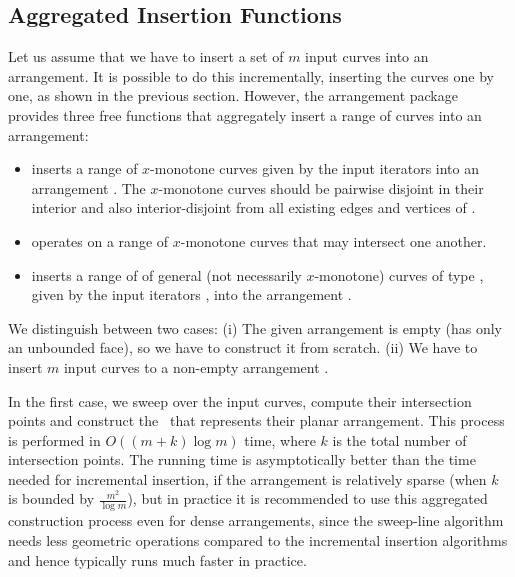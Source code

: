 
\subsection{Aggregated Insertion Functions}
\label{arr_ssec:agg_insert}

Let us assume that we have to insert a set of $m$ input curves into an
arrangement. It is possible to do this incrementally, 
inserting the curves one by one, as shown in the previous section.
However, the arrangement package provides three free functions that
aggregately insert a range of curves into an arrangement:
%
\begin{itemize}
\item {} inserts 
a range of $x$-monotone curves given by the input iterators
\ccc{[begin, end)} into an arrangement . The $x$-monotone
curves should be pairwise disjoint in their interior and also
interior-disjoint from all existing edges and vertices of .
%
\item {} operates on
a range of $x$-monotone curves that may intersect one another.
%
\item {} inserts a range of
of general (not necessarily $x$-monotone) curves of type ,
given by the input iterators \ccc{[begin, end)}, into the arrangement
.
\end{itemize}

We distinguish between two cases: (i) The given arrangement
 is empty (has only an unbounded face), so we have to
construct it from scratch. (ii) We have to insert $m$ input curves
to a non-empty arrangement .

In the first case, we sweep over the input curves, compute
their intersection points and construct the \dcel\ that represents
their planar arrangement. This process is performed in
$O\left((m + k)\log m\right)$ time, where $k$ is the total number
of intersection points. The running time is asymptotically better
than the time needed for incremental insertion, if the arrangement
is relatively sparse (when $k$ is bounded by $\frac{m^2}{\log
m}$), but in practice it is recommended to use this aggregated
construction process even for dense arrangements, since the
sweep-line algorithm needs less geometric operations compared to
the incremental insertion algorithms and hence typically runs 
much faster in practice.

